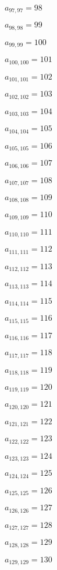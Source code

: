 \documentclass[a4paper,12pt]{article}
\begin{document}
$a _{ 97, 97 } = 98$

$a _{ 98, 98 } = 99$

$a _{ 99, 99 } = 100$

$a _{ 100, 100 } = 101$

$a _{ 101, 101 } = 102$

$a _{ 102, 102 } = 103$

$a _{ 103, 103 } = 104$

$a _{ 104, 104 } = 105$

$a _{ 105, 105 } = 106$

$a _{ 106, 106 } = 107$

$a _{ 107, 107 } = 108$

$a _{ 108, 108 } = 109$

$a _{ 109, 109 } = 110$

$a _{ 110, 110 } = 111$

$a _{ 111, 111 } = 112$

$a _{ 112, 112 } = 113$

$a _{ 113, 113 } = 114$

$a _{ 114, 114 } = 115$

$a _{ 115, 115 } = 116$

$a _{ 116, 116 } = 117$

$a _{ 117, 117 } = 118$

$a _{ 118, 118 } = 119$

$a _{ 119, 119 } = 120$

$a _{ 120, 120 } = 121$

$a _{ 121, 121 } = 122$

$a _{ 122, 122 } = 123$

$a _{ 123, 123 } = 124$

$a _{ 124, 124 } = 125$

$a _{ 125, 125 } = 126$

$a _{ 126, 126 } = 127$

$a _{ 127, 127 } = 128$

$a _{ 128, 128 } = 129$

$a _{ 129, 129 } = 130$
\end{document}
